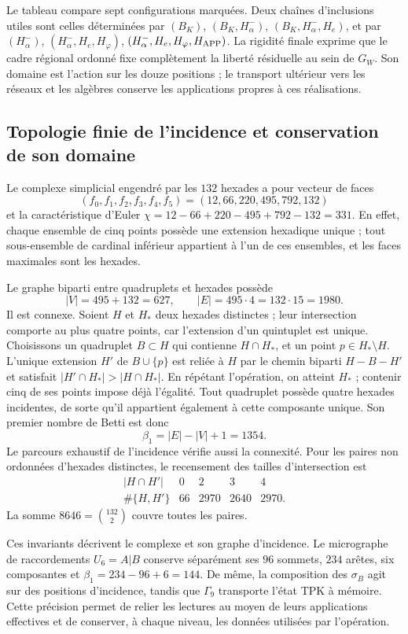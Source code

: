 Le tableau compare sept configurations marquées. Deux chaînes
d'inclusions utiles sont celles déterminées par
\((B_K)\), \((B_K,H^-_\alpha)\), \((B_K,H^-_\alpha,H_e)\),
et par
\((H^-_\alpha)\), \((H^-_\alpha,H_e,H_\varphi)\),
\((H^-_\alpha,H_e,H_\varphi,H_{\rm APP})\).
La rigidité finale exprime que le cadre régional ordonné fixe
complètement la liberté résiduelle au sein de \(G_W\). Son domaine est
l'action sur les douze positions ; le transport ultérieur vers les
réseaux et les algèbres conserve les applications propres à ces réalisations.

\subsection{Topologie finie de l'incidence et conservation de son domaine}
\label{star27:topologia}

Le complexe simplicial engendré par les \(132\) hexades a pour vecteur
de faces
\[
(f_0,f_1,f_2,f_3,f_4,f_5)=(12,66,220,495,792,132)
\]
et la caractéristique d'Euler \(\chi=12-66+220-495+792-132=331\). En effet, chaque ensemble de cinq points possède une extension hexadique unique ; tout sous-ensemble de cardinal inférieur appartient à l'un de ces ensembles, et les faces maximales sont les hexades.

Le graphe biparti entre quadruplets et hexades possède
\[
|V|=495+132=627,\qquad |E|=495\cdot4=132\cdot15=1980.
\]
Il est connexe. Soient \(H\) et \(H_*\) deux hexades distinctes ; leur
intersection comporte au plus quatre points, car l'extension
d'un quintuplet est unique. Choisissons un quadruplet \(B\subset H\)
qui contienne \(H\cap H_*\), et un point \(p\in H_*\setminus H\).
L'unique extension \(H'\) de \(B\cup\{p\}\) est reliée à
\(H\) par le chemin biparti \(H-B-H'\) et satisfait
\(|H'\cap H_*|>|H\cap H_*|\). En répétant l'opération, on
atteint \(H_*\) ; contenir cinq de ses points impose déjà
l'égalité. Tout quadruplet possède quatre hexades incidentes, de
sorte qu'il appartient également à cette composante unique.
Son premier nombre de Betti est donc
\[
\beta_1=|E|-|V|+1=1354.
\]
Le parcours exhaustif de l'incidence vérifie aussi la
connexité. Pour les paires non ordonnées d'hexades distinctes, le recensement
des tailles d'intersection est
\[
\begin{array}{c|rrrr}
|H\cap H'|&0&2&3&4\\ \hline
\#\{H,H'\}&66&2970&2640&2970 .
\end{array}
\]
La somme \(8646=\binom{132}{2}\) couvre toutes les paires.

Ces invariants décrivent le complexe et son graphe d'incidence.
Le micrographe de raccordements \(U_6=A|B\) conserve séparément ses
\(96\) sommets, \(234\) arêtes, six composantes et
\(\beta_1=234-96+6=144\). De même, la composition des
\(\sigma_B\) agit sur des positions d'incidence, tandis que
\(\Gamma_9\) transporte l'état TPK à mémoire. Cette précision
permet de relier les lectures au moyen de leurs applications effectives et de
conserver, à chaque niveau, les données utilisées par l'opération.
